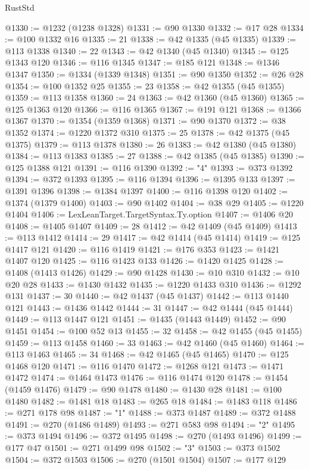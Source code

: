 \begin{lexlean}{RustStd}
\begin{coremodule}
@1330 := @1232 (@1238 @1328)
@1331 := @90 @1330
@1332 := @17 @28
@1334 := @100 @1332 @16
@1335 := 21
@1338 := @42 @1335 (@45 @1335)
@1339 := @113 @1338
@1340 := 22
@1343 := @42 @1340 (@45 @1340)
@1345 := @125 @1343 @120
@1346 := @116 @1345
@1347 := @185 @121
@1348 := @1346 @1347
@1350 := @1334 (@1339 @1348)
@1351 := @90 @1350
@1352 := @26 @28
@1354 := @100 @1352 @25
@1355 := 23
@1358 := @42 @1355 (@45 @1355)
@1359 := @113 @1358
@1360 := 24
@1363 := @42 @1360 (@45 @1360)
@1365 := @125 @1363 @120
@1366 := @116 @1365
@1367 := @191 @121
@1368 := @1366 @1367
@1370 := @1354 (@1359 @1368)
@1371 := @90 @1370
@1372 := @38 @1352
@1374 := @1220 @1372 @310
@1375 := 25
@1378 := @42 @1375 (@45 @1375)
@1379 := @113 @1378
@1380 := 26
@1383 := @42 @1380 (@45 @1380)
@1384 := @113 @1383
@1385 := 27
@1388 := @42 @1385 (@45 @1385)
@1390 := @125 @1388 @121
@1391 := @116 @1390
@1392 := "4"
@1393 := @373 @1392
@1394 := @372 @1393
@1395 := @116 @1394
@1396 := @1395 @133
@1397 := @1391 @1396
@1398 := @1384 @1397
@1400 := @116 @1398 @120
@1402 := @1374 (@1379 @1400)
@1403 := @90 @1402
@1404 := @38 @29
@1405 := @1220 @1404
@1406 := LexLeanTarget.TargetSyntax.Ty.option
@1407 := @1406 @20
@1408 := @1405 @1407
@1409 := 28
@1412 := @42 @1409 (@45 @1409)
@1413 := @113 @1412
@1414 := 29
@1417 := @42 @1414 (@45 @1414)
@1419 := @125 @1417 @121
@1420 := @116 @1419
@1421 := @176 @353
@1423 := @1421 @1407 @120
@1425 := @116 @1423 @133
@1426 := @1420 @1425
@1428 := @1408 (@1413 @1426)
@1429 := @90 @1428
@1430 := @10 @310
@1432 := @10 @20 @28
@1433 := @1430 @1432
@1435 := @1220 @1433 @310
@1436 := @1292 @131
@1437 := 30
@1440 := @42 @1437 (@45 @1437)
@1442 := @113 @1440 @121
@1443 := @1436 @1442
@1444 := 31
@1447 := @42 @1444 (@45 @1444)
@1449 := @113 @1447 @121
@1451 := @1435 (@1443 @1449)
@1452 := @90 @1451
@1454 := @100 @52 @13
@1455 := 32
@1458 := @42 @1455 (@45 @1455)
@1459 := @113 @1458
@1460 := 33
@1463 := @42 @1460 (@45 @1460)
@1464 := @113 @1463
@1465 := 34
@1468 := @42 @1465 (@45 @1465)
@1470 := @125 @1468 @120
@1471 := @116 @1470
@1472 := @1268 @121
@1473 := @1471 @1472
@1474 := @1464 @1473
@1476 := @116 @1474 @120
@1478 := @1454 (@1459 @1476)
@1479 := @90 @1478
@1480 := @1430 @28
@1481 := @100 @1480
@1482 := @1481 @18
@1483 := @265 @18
@1484 := @1483 @118
@1486 := @271 @178 @98
@1487 := "1"
@1488 := @373 @1487
@1489 := @372 @1488
@1491 := @270 (@1486 @1489)
@1493 := @271 @583 @98
@1494 := "2"
@1495 := @373 @1494
@1496 := @372 @1495
@1498 := @270 (@1493 @1496)
@1499 := @177 @47
@1501 := @271 @1499 @98
@1502 := "3"
@1503 := @373 @1502
@1504 := @372 @1503
@1506 := @270 (@1501 @1504)
@1507 := @177 @129

\end{coremodule}
\end{lexlean}
